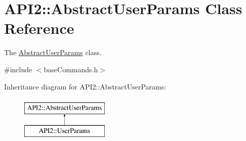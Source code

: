 \hypertarget{class_a_p_i2_1_1_abstract_user_params}{\section{A\-P\-I2\-:\-:Abstract\-User\-Params Class Reference}
\label{class_a_p_i2_1_1_abstract_user_params}
}


The \hyperlink{class_a_p_i2_1_1_abstract_user_params}{Abstract\-User\-Params} class.  




{\ttfamily \#include $<$base\-Commands.\-h$>$}

Inheritance diagram for A\-P\-I2\-:\-:Abstract\-User\-Params\-:\begin{figure}[H]
\begin{center}
\leavevmode
\includegraphics[height=2.000000cm]{class_a_p_i2_1_1_abstract_user_params}
\end{center}
\end{figure}
